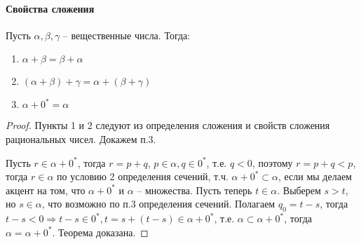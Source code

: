 \documentclass[main]{subfiles}
\begin{document}
\paragraph{Свойства сложения}
\begin{theorem}
    Пусть $\alpha, \beta, \gamma$ -- вещественные числа. Тогда:
    \begin{enumerate}
        \item $\alpha + \beta = \beta + \alpha$
        \item $(\alpha + \beta) + \gamma = \alpha + (\beta + \gamma)$
        \item $\alpha + 0^* = \alpha$
    \end{enumerate}
\end{theorem}
\begin{proof}
    Пункты 1 и 2 следуют из определения сложения и свойств сложения
    рациональных чисел. Докажем п.3.

    Пусть $r \in \alpha + 0^*$, тогда $r = p + q$, $p \in \alpha, q \in 0^*$,
    т.е. $q < 0$, поэтому $r = p + q < p$, тогда $r \in \alpha$ по условию 2
    определения сечений, т.ч. $\alpha + 0^* \subset \alpha$, если мы делаем
    акцент на том, что $\alpha + 0^*$ и $\alpha$ -- множества. Пусть теперь
    $t \in \alpha$. Выберем $s > t$, но $s \in \alpha$, что возможно по п.3
    определения сечений. Полагаем $q_0 = t - s$, тогда $t - s < 0 \Rightarrow
        t - s \in 0^*, t = s + (t - s) \in \alpha + 0^*$, т.е. $\alpha \subset
        \alpha + 0^*$, тогда $\alpha = \alpha + 0^*$. Теорема доказана.
\end{proof}
\end{document}
